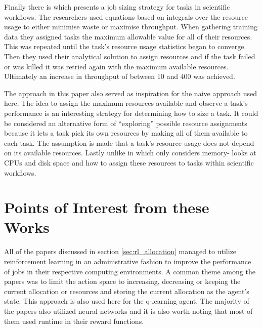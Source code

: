 Finally there is \cite{tovarjob} which presents a job sizing strategy for tasks in scientific workflows. The researchers used equations based on integrals over the resource usage to either minimise waste or maximise throughput. When gathering training data they assigned tasks the maximum allowable value for all of their resources. This was repeated until the task’s resource usage statistics began to converge. Then they used their analytical solution to assign resources and if the task failed or was killed it was retried again with the maximum available resources. Ultimately an increase in throughput of between 10 and 400 was achieved.

The approach in this paper also served as inspiration for the naive approach used here. The idea to assign the maximum resources available and observe a task’s performance is an interesting strategy for determining how to size a task. It could be considered an alternative form of “exploring” possible resource assignments because it lets a task pick its own resources by making all of them available to each task. The assumption is made that a task’s resource usage does not depend on its available resources. Lastly unlike in \cite{FeedbackBasedAllocation} which only considers memory- \cite{tovarjob} looks at CPUs and disk space and how to assign these resources to tasks within scientific workflows.

\section{Points of Interest from these Works}
\label{sec:takeaways}

All of the papers discussed in section \ref{sec:rl_allocation} managed to utilize reinforcement learning in an administrative fashion to improve the performance of jobs in their respective computing environments. A common theme among the papers was to limit the action space to increasing, decreasing or keeping the current allocation or resources and storing the current allocation as the agent’s state. This approach is also used here for the q-learning agent. The majority of the papers also utilized neural networks and it is also worth noting that most of them used runtime in their reward functions. 

